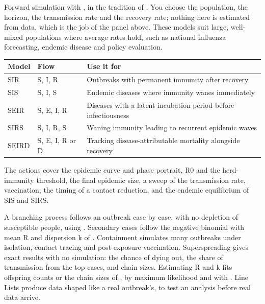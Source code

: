 Forward simulation with , in the tradition of . You choose the population, the horizon, the transmission rate and the recovery rate; nothing here is estimated from data, which is the job of the panel above. These models suit large, well-mixed populations where average rates hold, such as national influenza forecasting, endemic disease and policy evaluation.

\medskip
{\small
\begin{tabularx}{\linewidth}{@{}>{\raggedright\arraybackslash}p{18mm}>{\raggedright\arraybackslash}p{30mm}X@{}}
\toprule
\textbf{Model} & \textbf{Flow} & \textbf{Use it for} \\\midrule
SIR & S, I, R & Outbreaks with permanent immunity after recovery \\
SIS & S, I, S & Endemic diseases where immunity wanes immediately \\
SEIR & S, E, I, R & Diseases with a latent incubation period before infectiousness \\
SIRS & S, I, R, S & Waning immunity leading to recurrent epidemic waves \\
SEIRD & S, E, I, R or D & Tracking disease-attributable mortality alongside recovery \\\bottomrule
\end{tabularx}}

\medskip
The actions cover the epidemic curve and phase portrait, R0 and the herd-immunity threshold, the final epidemic size, a sweep of the transmission rate, vaccination, the timing of a contact reduction, and the endemic equilibrium of SIS and SIRS.

A branching process follows an outbreak case by case, with no depletion of susceptible people, using . Secondary cases follow the negative binomial with mean R and dispersion k of . Containment simulates many outbreaks under isolation, contact tracing and post-exposure vaccination. Superspreading gives exact results with no simulation: the chance of dying out, the share of transmission from the top cases, and chain sizes. Estimating R and k fits offspring counts or the chain sizes of , by maximum likelihood and with . Line Lists produce data shaped like a real outbreak's, to test an analysis before real data arrive.

